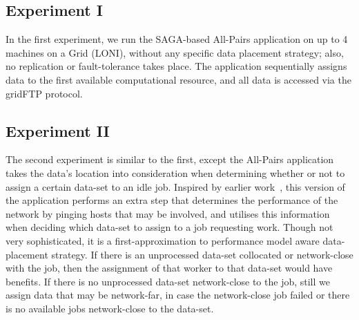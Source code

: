 \documentclass{rspublic}
\begin{document}
\subsection{Experiment I} In the first experiment, we run the SAGA-based
All-Pairs application on up to 4 machines on a Grid (LONI), without any
specific data placement strategy; also, no replication or
fault-tolerance takes place.  The application sequentially assigns data
to the first available computational resource, and all data is accessed
via the gridFTP protocol.
\subsection{Experiment II} The second experiment is similar to the
first, except the All-Pairs application takes the data's location into
consideration when determining whether or not to assign a certain
data-set to an idle job.  Inspired by earlier work~\citep{netperf}, this
version of the application performs an extra step that determines the
performance of the network by pinging hosts that may be involved, and
utilises this information when deciding which data-set to assign to a
job requesting work.  Though not very sophisticated, it is a
first-approximation to performance model aware data-placement strategy.
If there is an unprocessed data-set collocated or network-close with the
job, then the assignment of that worker to that data-set would have
benefits.  If there is no unprocessed data-set network-close to the job,
still we assign data that may be network-far, in case the network-close
job failed or there is no available jobs network-close to the data-set.
\end{document}
